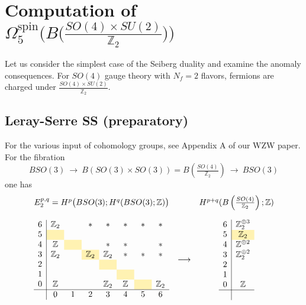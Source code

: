 \documentclass[12pt]{article}
\numberwithin{equation}{section}
\def\bZ{\mathbb{Z}}
\begin{document}
\appendix

\section{Computation of $\Omega_5^{\mathrm{spin}}\big(
	B\big(
		\tfrac{SO(4)\times SU(2)}{\bZ_2}
	\big)
\big)$}

Let us consider the simplest case of the Seiberg duality and examine the anomaly consequences.
For $SO(4)$ gauge theory with $N_f=2$ flavors, fermions are charged under $\tfrac{SO(4)\times SU(2)}{\bZ_2}$.
\subsection{Leray-Serre SS (preparatory)}
For the various input of cohomology groups, see Appendix A of our WZW paper.
For the fibration
\begin{equation}
	BSO(3)
	\ \to\ 
	B\left(SO(3)\times SO(3)\right)
	=
	B\left(\tfrac{SO(4)}{\bZ_2}\right)
	\ \to\ 
	BSO(3)
\end{equation}
one has
\begin{equation}
	\begin{array}{ccc}
		E_2^{p,q}=H^p\big(BSO(3);H^q(BSO(3);\bZ)\big) && H^{p+q}(B\left(\tfrac{SO(4)}{\bZ_2}\right);\bZ)\vspace{4mm}\\
		\begin{array}{c|ccccccccccccc}
			6 & \bZ_2 && \ast & \ast & \ast & \ast & \ast \\
			5  & \hphantom{\bZ_2}\cellcolor{lightyellow} & \hphantom{\bZ_2} & \hphantom{\bZ_2} & \hphantom{\bZ_2} & \hphantom{\bZ_2} & \hphantom{\bZ_2} \\
			4  & \bZ & \cellcolor{lightyellow} && \ast & \ast && \ast\\
			3  & \bZ_2 && \bZ_2\cellcolor{lightyellow} & \bZ_2 & \ast & \ast & \ast \\
			2  & &  && \cellcolor{lightyellow} &&\\
			1  &  &&  && \cellcolor{lightyellow} &&\\
			0 & \bZ &  && \bZ_2 & \bZ & \cellcolor{lightyellow} & \bZ_2\\
			\hline
			& 0 & 1 & 2 & 3 & 4 & 5 & 6 \\
		\end{array}
		& \longrightarrow & 
		\begin{array}{c|c}
			6  &\bZ_2^{\oplus 3}\\
			5  & \bZ_2\cellcolor{lightyellow}\\
			4  & \bZ^{\oplus 2}\\
			3  & \bZ_2^{\oplus 2}\\
			2  & \\
			1  & \\
			0 & \bZ\\
			\hline\\
		\end{array}
	\end{array}
\end{equation}
\end{document}
